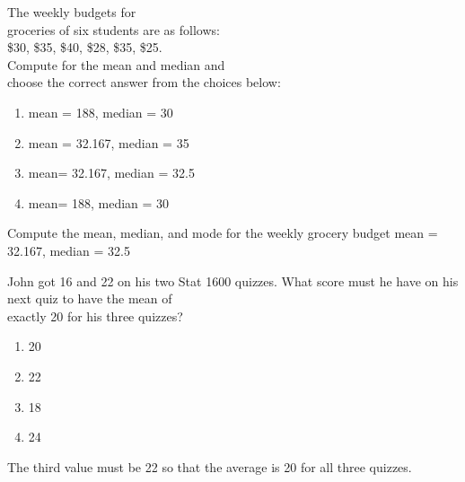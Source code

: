 \documentclass[11pt, chapterprefix=true]{scrbook}\usepackage[]{graphicx}\usepackage[]{color}
\begin{document}
\begin{exercises}
\begin{solution}
\end{solution}


  \begin{exercise} %

  The weekly budgets for \\ groceries of six students are as follows: \\
\$30, \$35, \$40, \$28, \$35, \$25. \\ Compute for the mean and median and \\ choose the correct answer from the choices below:
	\begin{enumerate}
	\item mean = 188, median = 30
	\item mean = 32.167, median = 35
	\item mean= 32.167, median = 32.5
	\item mean= 188, median = 30
	\end{enumerate}

	\vspace{5mm}
	\end{exercise}
	\vspace{2mm}
	\begin{solution}   %

	Compute the mean, median, and mode for the weekly grocery budget
	mean = 32.167, median = 32.5

	\end{solution}

  \begin{exercise} %

  John got 16 and 22 on his two Stat 1600 quizzes.  What score must he have on his next quiz to have the mean of \\ exactly 20 for his three quizzes?
	\begin{enumerate}
	\item 20
	\item 22
	\item 18
	\item 24
	\end{enumerate}

	\vspace{5mm}
	\end{exercise}
	\vspace{2mm}
	\begin{solution}   %

	The third value must be 22 so that the average is 20 for all three quizzes.


\end{solution}
\end{exercises}
\end{document}
